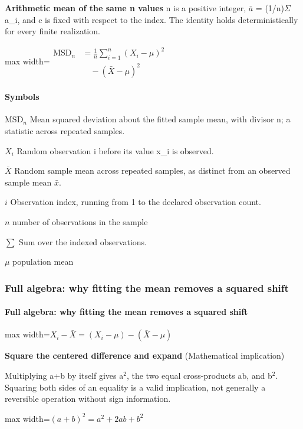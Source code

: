\documentclass[11pt,a4paper]{article}
\begin{document}
\par\textbf{Arithmetic mean of the same n values} n is a positive integer, \ensuremath{\bar{a}} = (1/n)\ensuremath{\Sigma}a\_i, and c is fixed with respect to the index. The identity holds deterministically for every finite realization.
\begin{center}\begin{adjustbox}{max width=\linewidth}$\displaystyle \boxed{\begin{aligned}\mathrm{MSD}_n&=\frac1n\sum_{i=1}^n(X_i-\mu)^2\\&\quad-(\bar X-\mu)^2\end{aligned}}$\end{adjustbox}\end{center}

\paragraph{Symbols}
\par\noindent\textbf{\(\mathrm{MSD}_n\)} Mean squared deviation about the fitted sample mean, with divisor n; a statistic across repeated samples.
\par\noindent\textbf{\(X_i\)} Random observation i before its value x\_i is observed.
\par\noindent\textbf{\(\bar X\)} Random sample mean across repeated samples, as distinct from an observed sample mean \ensuremath{\bar{x}}.
\par\noindent\textbf{\(i\)} Observation index, running from 1 to the declared observation count.
\par\noindent\textbf{\(n\)} number of observations in the sample
\par\noindent\textbf{\(\sum\)} Sum over the indexed observations.
\par\noindent\textbf{\(\mu\)} population mean
\subsubsection*{Full algebra: why fitting the mean removes a squared shift}
\paragraph{Full algebra: why fitting the mean removes a squared shift}
\begin{center}\begin{adjustbox}{max width=\linewidth}$\displaystyle X_i-\bar X=(X_i-\mu)-(\bar X-\mu)$\end{adjustbox}\end{center}
\noindent\textbf{Square the centered difference and expand} (Mathematical implication)\par
Multiplying a+b by itself gives a\ensuremath{{}^2}, the two equal cross-products ab, and b\ensuremath{{}^2}. Squaring both sides of an equality is a valid implication, not generally a reversible operation without sign information.
\begin{center}\begin{adjustbox}{max width=\linewidth}$\displaystyle (a+b)^2=a^2+2ab+b^2$\end{adjustbox}\end{center}
\end{document}
